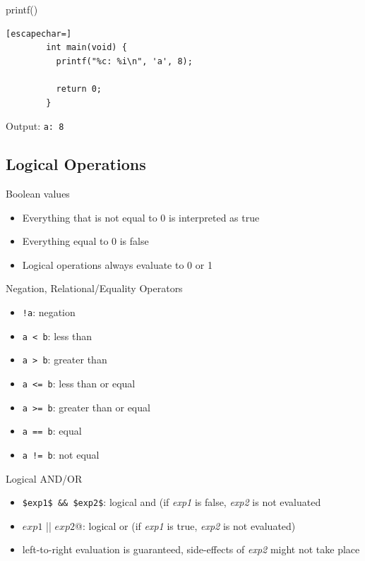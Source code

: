 \documentclass[english,compress]{beamer}
\begin{document}
\begin{frame}[fragile]{printf()}
	\begin{lstlisting}[escapechar=]
		int main(void) {
		  printf("%c: %i\n", 'a', 8);

		  return 0;
		}
	\end{lstlisting}
	Output: \verb|a: 8|
\end{frame}

\subsection{Logical Operations}
\begin{frame}{Boolean values}
	\begin{itemize}
		\item Everything that is not equal to 0 is interpreted as true
		\item Everything equal to 0 is false
		\item Logical operations always evaluate to 0 or 1
	\end{itemize}
\end{frame}

\begin{frame}{Negation, Relational/Equality Operators}
	\begin{itemize}
		\item \lstinline|!a|: negation
		\item \lstinline|a < b|: less than
		\item \lstinline|a > b|: greater than
		\item \lstinline|a <= b|: less than or equal
		\item \lstinline|a >= b|: greater than or equal
		\item \lstinline|a == b|: equal
		\item \lstinline|a != b|: not equal
	\end{itemize}
\end{frame}

\begin{frame}{Logical AND/OR}
	\begin{itemize}
		\item \lstinline|$exp1$ && $exp2$|: logical and (if \textit{exp1} is false, \textit{exp2} is not evaluated
		\item \lstinline@$exp1$ || $exp2$@: logical or (if \textit{exp1} is true, \textit{exp2} is not evaluated)
		\item left-to-right evaluation is guaranteed, side-effects
			of \textit{exp2} might not take place
	\end{itemize}
\end{frame}
\end{document}
